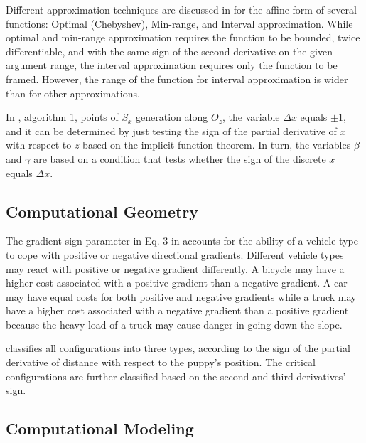 \documentclass[11pt]{book}
\begin{document}
Different approximation techniques are discussed in \cite{fryazinov2010extending}
for the affine form of several functions: Optimal (Chebyshev), Min-range,
and Interval approximation. While optimal and min-range approximation
requires the function to be bounded, twice differentiable, and with
the same sign of the second derivative on the given argument range,
the interval approximation requires only the function to be framed.
However, the range of the function for interval approximation is wider
than for other approximations.

In \cite{namane2018fast}, algorithm 1, \textquotedbl points of $S_{x}$
generation along $O_{z}$\textquotedbl , the variable $\Delta x$
equals $\pm1$, and it can be determined by just testing the sign
of the partial derivative of $x$ with respect to $z$ based on the
implicit function theorem. In turn, the variables $\beta$ and $\gamma$
are based on a condition that tests whether the sign of the discrete
$x$ equals $\Delta x$.


\subsection{Computational Geometry}

The gradient-sign parameter in Eq. 3 in \cite{horng2002vehicle} accounts
for the ability of a vehicle type to cope with positive or negative
directional gradients. Different vehicle types may react with positive
or negative gradient differently. A bicycle may have a higher cost
associated with a positive gradient than a negative gradient. A car
may have equal costs for both positive and negative gradients while
a truck may have a higher cost associated with a negative gradient
than a positive gradient because the heavy load of a truck may cause
danger in going down the slope.

\cite{abrahamsen2021chasing} classifies all configurations into three
types, according to the sign of the partial derivative of distance
with respect to the puppy's position. The critical configurations
are further classified based on the second and third derivatives'
sign.


\subsection{Computational Modeling}
\end{document}
